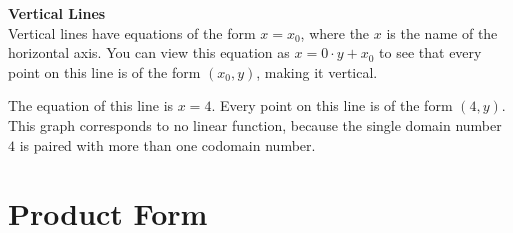 \documentclass{ximera}
\begin{document}
\textbf{Vertical Lines} \\
Vertical lines have equations of the form $x = x_0$, where the $x$ is the name of the horizontal axis. You can view this equation as $x = 0 \cdot y + x_0$ to see that every point on this line is of the form $(x_0,y)$, making it vertical.





\begin{example}

\begin{image}
\end{image}

The equation of this line is $x=4$.  Every point on this line is of the form $(4, y)$. This graph corresponds to no linear function, because the single domain number $4$ is paired with more than one codomain number.


\end{example}






























\section{Product Form}
\end{document}
